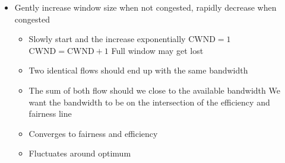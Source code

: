 \begin{itemize}
\begin{itemize}
        \end{itemize}
        \begin{itemize}
            \item Gently increase window size when not congested, rapidly decrease when congested
                \begin{itemize}
                     Get a quick estimate of the available bandwidth
                    \item Slowly start and the increase exponentially
                     $\text{CWND} = 1$
                     $\text{CWND} = \text{CWND} + 1$
                    \icon Full window may get lost
                \end{itemize}
                \begin{itemize}
                    \item Two identical flows should end up with the same bandwidth
                    \item The sum of both flow should we close to the available bandwidth
                         We want the bandwidth to be on the intersection of the efficiency and fairness line
                \end{itemize}
                \begin{itemize}
                     Add a constant to the point
                        \begin{itemize}
                            \item In TCP increment CWND by $1 / \text{CWND}$
                            \item $\implies$ Increment at most by $1$ in an iteration
                        \end{itemize}
                     Take a fraction of the point
                        \begin{itemize}
                            \item In TCP set $\text{CWND} = 1$
                        \end{itemize}
                    \item Converges to fairness and efficiency
                    \item Fluctuates around optimum
                \end{itemize}

\end{itemize}
\end{itemize}
